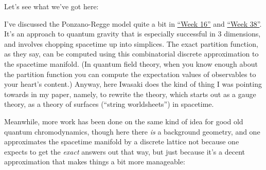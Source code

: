 \documentclass{article}
\def\tightlist{}
\renewcommand{\texttt}[1]{%
  \begingroup
  \ttfamily
  \begingroup\lccode`~=`/\lowercase{\endgroup\def~}{/\discretionary{}{}{}}%
  \begingroup\lccode`~=`[\lowercase{\endgroup\def~}{[\discretionary{}{}{}}%
  \begingroup\lccode`~=`.\lowercase{\endgroup\def~}{.\discretionary{}{}{}}%
  \catcode`/=\active\catcode`[=\active\catcode`.=\active
  \scantokens{#1\noexpand}%
  \endgroup
}
\begin{document}
Let's see what we've got here:


I've discussed the Ponzano-Regge model quite a bit in
\protect\hyperlink{week16}{``Week 16''} and
\protect\hyperlink{week38}{``Week 38''}. It's an approach to quantum
gravity that is especially successful in 3 dimensions, and involves
chopping spacetime up into simplices. The exact partition function, as
they say, can be computed using this combinatorial discrete
approximation to the spacetime manifold. (In quantum field theory, when
you know enough about the partition function you can compute the
expectation values of observables to your heart's content.) Anyway, here
Iwasaki does the kind of thing I was pointing towards in my paper,
namely, to rewrite the theory, which starts out as a gauge theory, as a
theory of surfaces (``string worldsheets'') in spacetime.

Meanwhile, more work has been done on the same kind of idea for good old
quantum chromodynamics, though here there \emph{is} a background
geometry, and one approximates the spacetime manifold by a discrete
lattice not because one expects to get the \emph{exact} answers out that
way, but just because it's a decent approximation that makes things a
bit more manageable:

\end{document}
